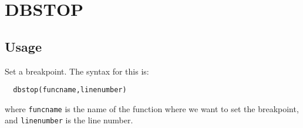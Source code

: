 \section{DBSTOP}

\subsection{Usage}

Set a breakpoint.  The syntax for this is:
\begin{verbatim}
  dbstop(funcname,linenumber)
\end{verbatim}
where \verb|funcname| is the name of the function where we want
to set the breakpoint, and \verb|linenumber| is the line number.
